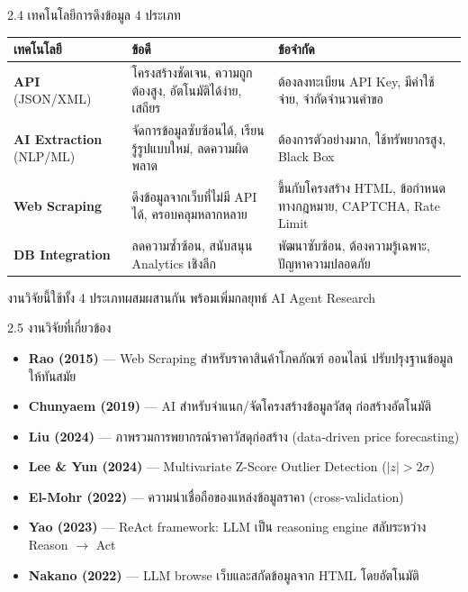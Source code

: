 \documentclass[aspectratio=169,11pt]{beamer}
\begin{document}
\begin{frame}{2.4 เทคโนโลยีการดึงข้อมูล 4 ประเภท}
  \footnotesize
  \begin{table}
    \centering
    \begin{tabularx}{\textwidth}{l X X}
      \toprule
      \textbf{เทคโนโลยี} & \textbf{ข้อดี} & \textbf{ข้อจำกัด} \\
      \midrule
      \textbf{API} (JSON/XML)
        & โครงสร้างชัดเจน, ความถูกต้องสูง, อัตโนมัติได้ง่าย, เสถียร
        & ต้องลงทะเบียน API Key, มีค่าใช้จ่าย, จำกัดจำนวนคำขอ \\
      \midrule
      \textbf{AI Extraction} (NLP/ML)
        & จัดการข้อมูลซับซ้อนได้, เรียนรู้รูปแบบใหม่, ลดความผิดพลาด
        & ต้องการตัวอย่างมาก, ใช้ทรัพยากรสูง, Black Box \\
      \midrule
      \textbf{Web Scraping}
        & ดึงข้อมูลจากเว็บที่ไม่มี API ได้, ครอบคลุมหลากหลาย
        & ขึ้นกับโครงสร้าง HTML, ข้อกำหนดทางกฎหมาย, CAPTCHA, Rate Limit \\
      \midrule
      \textbf{DB Integration}
        & ลดความซ้ำซ้อน, สนับสนุน Analytics เชิงลึก
        & พัฒนาซับซ้อน, ต้องความรู้เฉพาะ, ปัญหาความปลอดภัย \\
      \bottomrule
    \end{tabularx}
  \end{table}
  \begin{center}
  \footnotesize งานวิจัยนี้ใช้ทั้ง 4 ประเภทผสมผสานกัน พร้อมเพิ่มกลยุทธ์ AI Agent Research
  \end{center}
\end{frame}

\begin{frame}{2.5 งานวิจัยที่เกี่ยวข้อง}
  \footnotesize
  \begin{itemize}
    \item \textbf{Rao (2015)} --- Web Scraping สำหรับราคาสินค้าโภคภัณฑ์
          ออนไลน์ ปรับปรุงฐานข้อมูลให้ทันสมัย
    \item \textbf{Chunyaem (2019)} --- AI สำหรับจำแนก/จัดโครงสร้างข้อมูลวัสดุ
          ก่อสร้างอัตโนมัติ
    \item \textbf{Liu (2024)} --- ภาพรวมการพยากรณ์ราคาวัสดุก่อสร้าง
          (data-driven price forecasting)
    \item \textbf{Lee \& Yun (2024)} --- Multivariate Z-Score Outlier Detection
          ($|z| > 2\sigma$)
    \item \textbf{El-Mohr (2022)} --- ความน่าเชื่อถือของแหล่งข้อมูลราคา
          (cross-validation)
    \item \textbf{Yao (2023)} --- ReAct framework: LLM เป็น reasoning engine
          สลับระหว่าง Reason $\to$ Act
    \item \textbf{Nakano (2022)} --- LLM browse เว็บและสกัดข้อมูลจาก HTML
          โดยอัตโนมัติ
  \end{itemize}
\end{frame}
\end{document}
